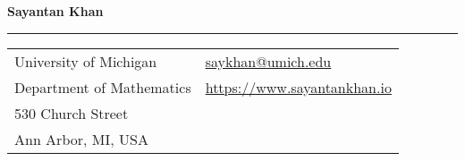 \documentclass[letterpaper,11pt,oneside]{article}
\begin{document}

\noindent  \LARGE{\textbf{Sayantan Khan}} \\
\vspace{-2ex}
\hrule
\normalsize


\begin{center}
\begin{tabular}{l l}
 University of Michigan   & \hspace{1in} \href{mailto:saykhan@umich.edu}{saykhan@umich.edu} \\
 Department of Mathematics    & \hspace{1in}  \href{www.sayantankhan.io}{https://www.sayantankhan.io}   \\
 530 Church Street             & \hspace{1in}   \\
 Ann Arbor, MI, USA & \hspace{1in}  \\
\end{tabular}
\end{center}

\vspace{1em}

\end{document}
